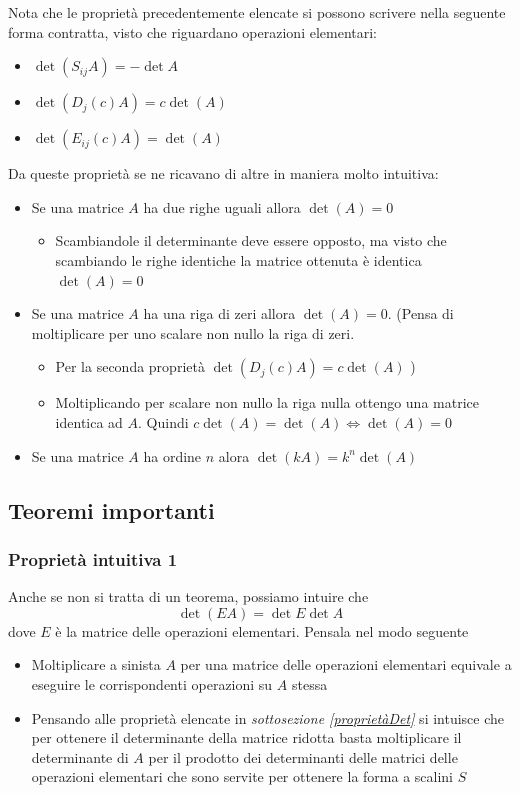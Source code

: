 \documentclass[12pt,a4paper,oneside]{article}
\begin{document}
Nota che le proprietà precedentemente elencate si possono scrivere nella seguente forma contratta, visto che riguardano operazioni elementari:
\begin{itemize}
	\item $ \det \left( S_{ij}A \right) = - \det A  $
	\item $ \det \left( D_j \left( c \right)A  \right)  = c \det \left( A \right) $
	\item $ \det \left( E_{ij}\left( c \right) A \right) = \det \left( A \right)  $
\end{itemize}
Da queste proprietà se ne ricavano di altre in maniera molto intuitiva:
\begin{itemize}
	\item Se una matrice $ A $ ha due righe uguali allora $ \det\left( A \right)  = 0 $
	      \begin{itemize}
		      \item Scambiandole il determinante deve essere opposto, ma visto che scambiando le righe identiche la matrice ottenuta è identica $ \det \left( A \right) =0 $
	      \end{itemize}
	\item Se una matrice $ A $ ha una riga di zeri allora $ \det \left( A \right)  =0 $. (Pensa di moltiplicare per uno scalare non nullo la riga di zeri.
	      \begin{itemize}
		      \item Per la seconda proprietà $ \det \left( D_j\left( c \right) A \right) = c \det\left( A \right) $ )
		      \item Moltiplicando per scalare non nullo la riga nulla ottengo una matrice identica ad $ A $. Quindi $ c \det \left( A \right)  = \det \left( A \right) \Leftrightarrow \det\left( A \right) =0 $
	      \end{itemize}
	\item Se una matrice $  A $ ha ordine $ n $ alora $ \det\left( kA \right)  = k^{n} \det \left( A \right)  $
\end{itemize}

\subsection{Teoremi importanti}
\subsubsection*{Proprietà intuitiva 1}
Anche se non si tratta di un teorema, possiamo intuire che
\[
	\det\left( EA \right) = \det E \det A
\]
dove $ E $ è la matrice delle operazioni elementari. Pensala nel modo seguente
\begin{itemize}
	\item Moltiplicare a sinista $ A $ per una matrice delle operazioni elementari equivale a eseguire le corrispondenti operazioni su $ A $ stessa
	\item Pensando alle proprietà elencate in \textit{sottosezione \ref{proprietàDet}} si intuisce che per ottenere il determinante della matrice ridotta basta moltiplicare il determinante di $ A $ per il prodotto dei determinanti delle matrici delle operazioni elementari che sono servite per ottenere la forma a scalini $ S $
\end{itemize}
\end{document}
